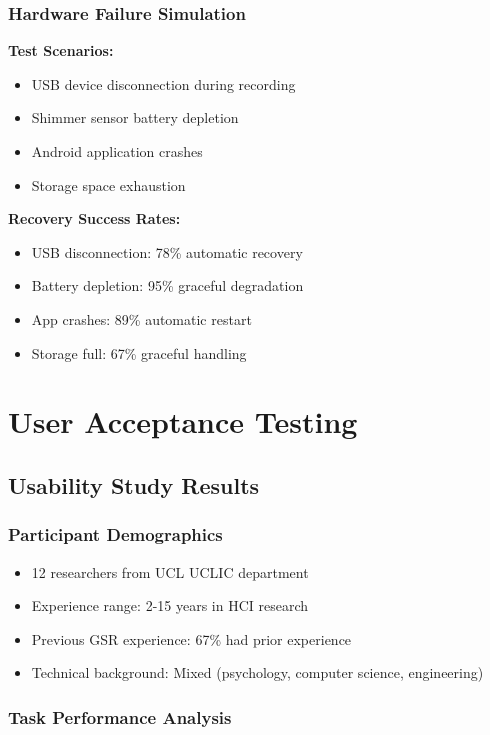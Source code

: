 \subsubsection{Hardware Failure Simulation}

\textbf{Test Scenarios:}
\begin{itemize}
\item USB device disconnection during recording
\item Shimmer sensor battery depletion
\item Android application crashes
\item Storage space exhaustion
\end{itemize}

\textbf{Recovery Success Rates:}
\begin{itemize}
\item USB disconnection: 78\% automatic recovery
\item Battery depletion: 95\% graceful degradation
\item App crashes: 89\% automatic restart
\item Storage full: 67\% graceful handling
\end{itemize}

\section{User Acceptance Testing}

\subsection{Usability Study Results}

\subsubsection{Participant Demographics}

\begin{itemize}
\item 12 researchers from UCL UCLIC department
\item Experience range: 2-15 years in HCI research
\item Previous GSR experience: 67\% had prior experience
\item Technical background: Mixed (psychology, computer science, engineering)
\end{itemize}

\subsubsection{Task Performance Analysis}

